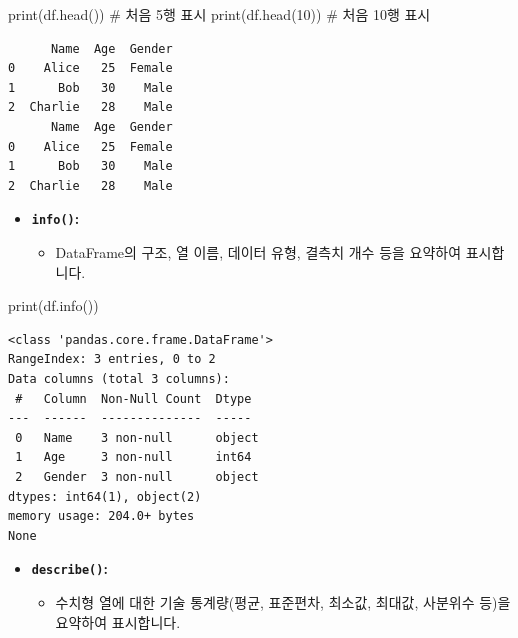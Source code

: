 \documentclass[
  letterpaper,
]{book}
\newenvironment{Shaded}{\begin{snugshade}}{\end{snugshade}}
\newcommand{\BuiltInTok}[1]{\textcolor[rgb]{0.00,0.23,0.31}{#1}}
\newcommand{\CommentTok}[1]{\textcolor[rgb]{0.37,0.37,0.37}{#1}}
\newcommand{\DecValTok}[1]{\textcolor[rgb]{0.68,0.00,0.00}{#1}}
\newcommand{\NormalTok}[1]{\textcolor[rgb]{0.00,0.23,0.31}{#1}}
\providecommand{\tightlist}{%
  \setlength{\itemsep}{0pt}\setlength{\parskip}{0pt}}
\begin{document}
\begin{Shaded}
\begin{Highlighting}[]
    \BuiltInTok{print}\NormalTok{(df.head()) }\CommentTok{\# 처음 5행 표시}
    \BuiltInTok{print}\NormalTok{(df.head(}\DecValTok{10}\NormalTok{)) }\CommentTok{\# 처음 10행 표시}
\end{Highlighting}
\end{Shaded}

\begin{verbatim}
      Name  Age  Gender
0    Alice   25  Female
1      Bob   30    Male
2  Charlie   28    Male
      Name  Age  Gender
0    Alice   25  Female
1      Bob   30    Male
2  Charlie   28    Male
\end{verbatim}

\begin{itemize}
\item
  \textbf{\texttt{info()}:}

  \begin{itemize}
  \tightlist
  \item
    DataFrame의 구조, 열 이름, 데이터 유형, 결측치 개수 등을 요약하여
    표시합니다.
  \end{itemize}
\end{itemize}

\begin{Shaded}
\begin{Highlighting}[]
    \BuiltInTok{print}\NormalTok{(df.info())}
\end{Highlighting}
\end{Shaded}

\begin{verbatim}
<class 'pandas.core.frame.DataFrame'>
RangeIndex: 3 entries, 0 to 2
Data columns (total 3 columns):
 #   Column  Non-Null Count  Dtype 
---  ------  --------------  ----- 
 0   Name    3 non-null      object
 1   Age     3 non-null      int64 
 2   Gender  3 non-null      object
dtypes: int64(1), object(2)
memory usage: 204.0+ bytes
None
\end{verbatim}

\begin{itemize}
\item
  \textbf{\texttt{describe()}:}

  \begin{itemize}
  \tightlist
  \item
    수치형 열에 대한 기술 통계량(평균, 표준편차, 최소값, 최대값,
    사분위수 등)을 요약하여 표시합니다.
  \end{itemize}
\end{itemize}
\end{document}
